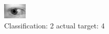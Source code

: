 \begin{figure}[h!]
\begin{center}
\includegraphics[width=0.60\columnwidth]{figures/ID854_class_2_target_4.png}
\end{center}
\caption{ Classification: 2 actual target: 4}
\label{fig:ID854_class_2_target_4}
\end{figure}
